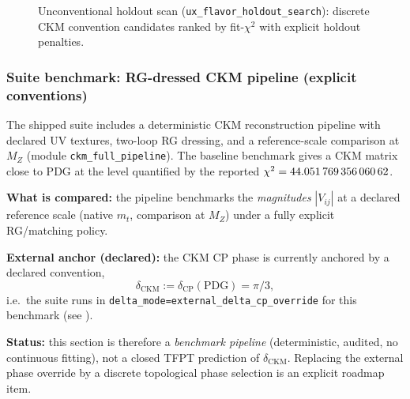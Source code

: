 \begin{figure}[H]
\centering
{}
\caption{Unconventional holdout scan (\texttt{ux\_flavor\_holdout\_search}): discrete CKM convention candidates ranked by fit-$\chi^2$ with explicit holdout penalties.}
\end{figure}

\subsubsection{Suite benchmark: RG-dressed CKM pipeline (explicit conventions)}
The shipped suite includes a deterministic CKM reconstruction pipeline with declared UV textures, two-loop RG dressing, and a reference-scale comparison at $M_Z$ (module \texttt{ckm\_full\_pipeline}). The baseline benchmark gives a CKM matrix close to PDG at the level quantified by the reported $\chi^2=\num{44.05176935606062}$.

\begin{tcolorbox}[colback=yellow!3, colframe=yellow!60!black, breakable,
title={\textbf{Benchmark hygiene: explicit external phase override (no hidden fit)}}, fonttitle=\bfseries\small]
\textbf{What is compared:} the pipeline benchmarks the \emph{magnitudes} $|V_{ij}|$ at a declared reference scale (native $m_t$, comparison at $M_Z$) under a fully explicit RG/matching policy.

\textbf{External anchor (declared):} the CKM CP phase is currently anchored by a declared convention,
\[
\delta_{\mathrm{CKM}} := \delta_{\mathrm{CP}}(\mathrm{PDG}) = \pi/3,
\]
i.e.\ the suite runs in \texttt{delta\_mode=external\_delta\_cp\_override} for this benchmark (see ).

\textbf{Status:} this section is therefore a \emph{benchmark pipeline} (deterministic, audited, no continuous fitting), not a closed TFPT prediction of $\delta_{\mathrm{CKM}}$. Replacing the external phase override by a discrete topological phase selection is an explicit roadmap item.
\end{tcolorbox}

